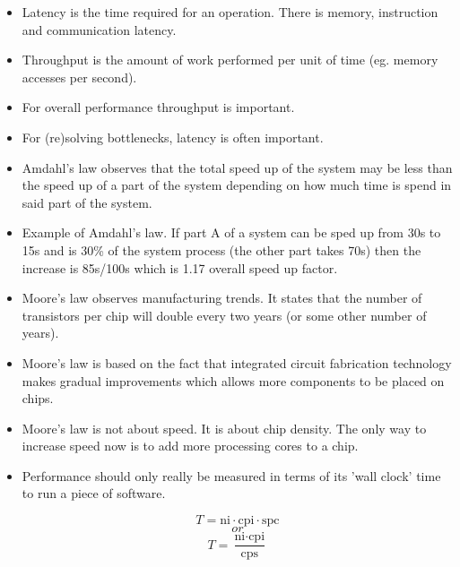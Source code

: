\documentclass{article}
\begin{document}
\begin{itemize}
\item Latency is the time required for an operation. There is memory, instruction and communication latency.
\item Throughput is the amount of work performed per unit of time (eg. memory accesses per second).
\item For overall performance throughput is important.
\item For (re)solving bottlenecks, latency is often important.
\item Amdahl's law observes that the total speed up of the system may be less than the speed up of a part of the system depending on how much time is spend in said part of the system.
\item Example of Amdahl's law. If part A of a system can be sped up from 30s to 15s and is 30\% of the system process (the other part takes 70s) then the increase is 85s/100s which is 1.17 overall speed up factor.
\item Moore's law observes manufacturing trends. It states that the number of transistors per chip will double every two years (or some other number of years). 
\item Moore's law is based on the fact that integrated circuit fabrication technology makes gradual improvements which allows more components to be placed on chips.
\item Moore's law is not about speed. It is about chip density. The only way to increase speed now is to add more processing cores to a chip.
\item Performance should only really be measured in terms of its 'wall clock' time to run a piece of software.

\[  T = \text{ni} \cdot \text{cpi} \cdot \text{spc} \]
\[or\]
\[ T = \frac{\text{ni} \cdot \text{cpi}}{\text{cps}} \]


\end{itemize}
\end{document}
